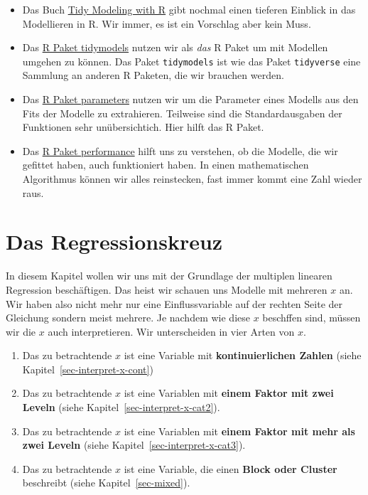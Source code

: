 \documentclass[
  letterpaper,
]{scrbook}
\providecommand{\tightlist}{%
  \setlength{\itemsep}{0pt}\setlength{\parskip}{0pt}}\usepackage{longtable,booktabs,array}
\begin{document}
\begin{itemize}
\tightlist
\item
  Das Buch \href{https://www.tmwr.org/}{Tidy Modeling with R} gibt
  nochmal einen tieferen Einblick in das Modellieren in R. Wir immer, es
  ist ein Vorschlag aber kein Muss.
\item
  Das \href{https://tidymodels.tidymodels.org/}{R Paket tidymodels}
  nutzen wir als \emph{das} R Paket um mit Modellen umgehen zu können.
  Das Paket \texttt{tidymodels} ist wie das Paket \texttt{tidyverse}
  eine Sammlung an anderen R Paketen, die wir brauchen werden.
\item
  Das \href{https://easystats.github.io/parameters/index.html}{R Paket
  parameters} nutzen wir um die Parameter eines Modells aus den Fits der
  Modelle zu extrahieren. Teilweise sind die Standardausgaben der
  Funktionen sehr unübersichtich. Hier hilft das R Paket.
\item
  Das \href{https://easystats.github.io/performance/}{R Paket
  performance} hilft uns zu verstehen, ob die Modelle, die wir gefittet
  haben, auch funktioniert haben. In einen mathematischen Algorithmus
  können wir alles reinstecken, fast immer kommt eine Zahl wieder raus.
\end{itemize}

\hypertarget{das-regressionskreuz}{%
\section*{Das Regressionskreuz}\label{das-regressionskreuz}}

In diesem Kapitel wollen wir uns mit der Grundlage der multiplen
linearen Regression beschäftigen. Das heist wir schauen uns Modelle mit
mehreren \(x\) an. Wir haben also nicht mehr nur eine Einflussvariable
auf der rechten Seite der Gleichung sondern meist mehrere. Je nachdem
wie diese \(x\) beschffen sind, müssen wir die \(x\) auch
interpretieren. Wir unterscheiden in vier Arten von \(x\).

\begin{enumerate}
\def\labelenumi{\arabic{enumi})}
\tightlist
\item
  Das zu betrachtende \(x\) ist eine Variable mit
  \textbf{kontinuierlichen Zahlen} (siehe
  Kapitel~\ref{sec-interpret-x-cont})
\item
  Das zu betrachtende \(x\) ist eine Variablen mit \textbf{einem Faktor
  mit zwei Leveln} (siehe Kapitel~\ref{sec-interpret-x-cat2}).
\item
  Das zu betrachtende \(x\) ist eine Variablen mit \textbf{einem Faktor
  mit mehr als zwei Leveln} (siehe Kapitel~\ref{sec-interpret-x-cat3}).
\item
  Das zu betrachtende \(x\) ist eine Variable, die einen \textbf{Block
  oder Cluster} beschreibt (siehe Kapitel~\ref{sec-mixed}).
\end{enumerate}
\end{document}
